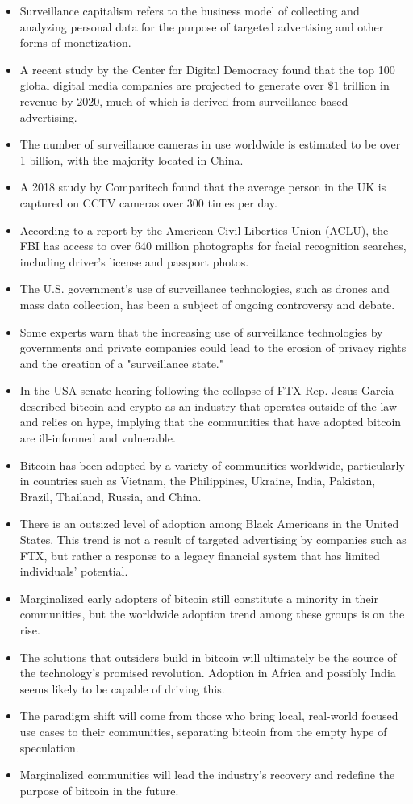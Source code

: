 \begin{itemize}
\item Surveillance capitalism refers to the business model of collecting and analyzing personal data for the purpose of targeted advertising and other forms of monetization.
\item A recent study by the Center for Digital Democracy found that the top 100 global digital media companies are projected to generate over \$1 trillion in revenue by 2020, much of which is derived from surveillance-based advertising.
\item The number of surveillance cameras in use worldwide is estimated to be over 1 billion, with the majority located in China.
\item A 2018 study by Comparitech found that the average person in the UK is captured on CCTV cameras over 300 times per day.
\item According to a report by the American Civil Liberties Union (ACLU), the FBI has access to over 640 million photographs for facial recognition searches, including driver's license and passport photos.
\item The U.S. government's use of surveillance technologies, such as drones and mass data collection, has been a subject of ongoing controversy and debate.
\item Some experts warn that the increasing use of surveillance technologies by governments and private companies could lead to the erosion of privacy rights and the creation of a "surveillance state."
\item In the USA senate hearing following the collapse of FTX Rep. Jesus Garcia described bitcoin and crypto as an industry that operates outside of the law and relies on hype, implying that the communities that have adopted bitcoin are ill-informed and vulnerable.
\item Bitcoin has been adopted by a variety of communities worldwide, particularly in countries such as Vietnam, the Philippines, Ukraine, India, Pakistan, Brazil, Thailand, Russia, and China.
\item There is an outsized level of adoption among Black Americans in the United States. This trend is not a result of targeted advertising by companies such as FTX, but rather a response to a legacy financial system that has limited individuals' potential.
\item Marginalized early adopters of bitcoin still constitute a minority in their communities, but the worldwide adoption trend among these groups is on the rise.
\item The solutions that outsiders build in bitcoin will ultimately be the source of the technology's promised revolution. Adoption in Africa and possibly India seems likely to be capable of driving this.
\item The paradigm shift will come from those who bring local, real-world focused use cases to their communities, separating bitcoin from the empty hype of speculation.
\item Marginalized communities will lead the industry's recovery and redefine the purpose of bitcoin in the future.
\end{itemize} 

